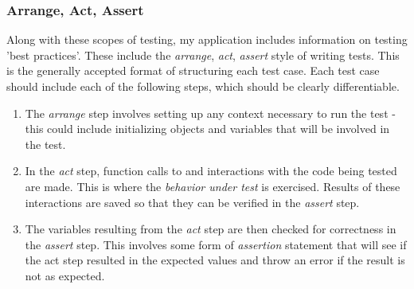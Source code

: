 \documentclass[10pt,twocolumn]{article}
\begin{document}

\subsubsection{Arrange, Act, Assert}

Along with these scopes of testing, my application includes information on testing 'best practices'. These include
the \textit{arrange}, \textit{act}, \textit{assert} style of writing tests. This is the generally accepted format of 
structuring each test case. Each test case should include each of the following steps, which should be clearly differentiable. 

\begin{enumerate}
    \item{The \textit{arrange} step involves setting up any context necessary to run the test - this could 
    include initializing objects and variables that will be involved in the test.}
    \item{In the \textit{act} step, function calls to and interactions with the code being tested are made. This is where the \textit{behavior 
    under test} is exercised. Results of these interactions are saved so that they can be verified in the \textit{assert} step.}
    \item{The variables resulting from the \textit{act} step are then checked for correctness in the \textit{assert} step. This involves
    some form of \textit{assertion} statement that will see if the act step resulted in the expected values and throw
    an error if the result is not as expected.}
\end{enumerate}
\end{document}
